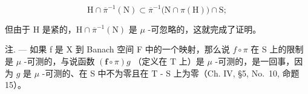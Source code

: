 \[
\mathrm{H} \cap \overline {{\pi}} ^ {- 1} (\mathrm{N}) \subset \overline {{\pi}} ^ {- 1} \bigl (\mathrm{N} \cap \pi (\mathrm{H}) \bigr) \cap \mathrm{S};
\]

但由于 H 是紧的，\(\mathrm{H} \cap \overline{\pi}^{-1}(\mathrm{N})\) 是 \(\mu\) -可忽略的，这就完成了证明。

注. --- 如果 f 是 X 到 Banach 空间 F 中的一个映射，那么说 \(f \circ \pi\) 在 S 上的限制是 \(\mu\) -可测的，与说函数 \((\mathbf{f} \circ \pi)g\) （定义在 T 上）是 \(\mu\) -可测的，是一回事，因为 \(g\) 是 \(\mu\) -可测的、在 S 中不为零且在 T - S 上为零（Ch. IV, §5, No.~10, 命题 15）。

